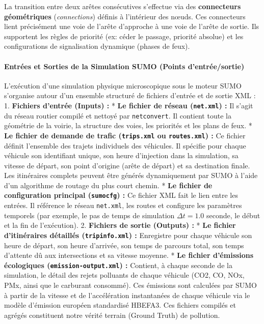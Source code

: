 \documentclass[10pt, a4paper]{article}
\begin{document}
La transition entre deux arêtes consécutives s'effectue via des
\textbf{connecteurs géométriques} (\emph{connections}) définis à
l'intérieur des nœuds. Ces connecteurs lient précisément une voie de
l'arête d'approche à une voie de l'arête de sortie. Ils supportent les
règles de priorité (ex: céder le passage, priorité absolue) et les
configurations de signalisation dynamique (phases de feux).

\paragraph{Entrées et Sorties de la Simulation SUMO (Points
d'entrée/sortie)}\label{entruxe9es-et-sorties-de-la-simulation-sumo-points-dentruxe9esortie}

L'exécution d'une simulation physique microscopique sous le moteur SUMO
s'organise autour d'un ensemble structuré de fichiers d'entrée et de
sortie XML : 1. \textbf{Fichiers d'entrée (Inputs) :} * \textbf{Le
fichier de réseau (\texttt{net.xml}) :} Il s'agit du réseau routier
compilé et nettoyé par \texttt{netconvert}. Il contient toute la
géométrie de la voirie, la structure des voies, les priorités et les
plans de feux. * \textbf{Le fichier de demande de trafic
(\texttt{trips.xml} ou \texttt{routes.xml}) :} Ce fichier définit
l'ensemble des trajets individuels des véhicules. Il spécifie pour
chaque véhicule son identifiant unique, son heure d'injection dans la
simulation, sa vitesse de départ, son point d'origine (arête de départ)
et sa destination finale. Les itinéraires complets peuvent être générés
dynamiquement par SUMO à l'aide d'un algorithme de routage du plus court
chemin. * \textbf{Le fichier de configuration principal
(\texttt{sumocfg}) :} Ce fichier XML fait le lien entre les entrées. Il
référence le réseau \texttt{net.xml}, les routes et configure les
paramètres temporels (par exemple, le pas de temps de simulation
\(\Delta t = 1.0\) seconde, le début et la fin de l'exécution). 2.
\textbf{Fichiers de sortie (Outputs) :} * \textbf{Le fichier
d'itinéraires détaillés (\texttt{tripinfo.xml}) :} Enregistre pour
chaque véhicule son heure de départ, son heure d'arrivée, son temps de
parcours total, son temps d'attente dû aux intersections et sa vitesse
moyenne. * \textbf{Le fichier d'émissions écologiques
(\texttt{emission-output.xml}) :} Contient, à chaque seconde de la
simulation, le détail des rejets polluants de chaque véhicule (CO2, CO,
NOx, PMx, ainsi que le carburant consommé). Ces émissions sont calculées
par SUMO à partir de la vitesse et de l'accélération instantanées de
chaque véhicule via le modèle d'émission européen standardisé HBEFA3.
Ces fichiers compilés et agrégés constituent notre vérité terrain
(Ground Truth) de pollution.
\end{document}
